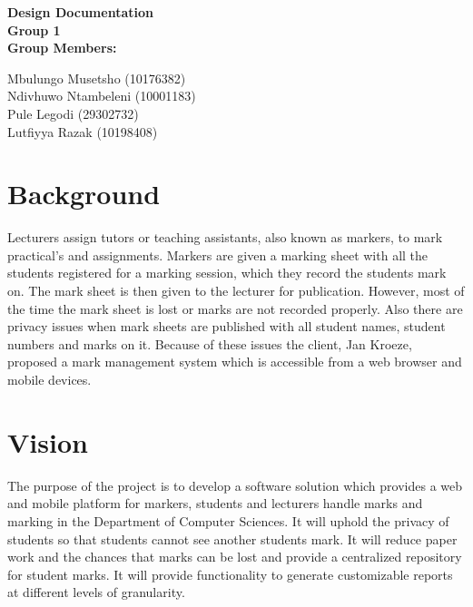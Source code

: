 \documentclass[12pt]{article}
\newcommand{\Title}{Design Documentation} %
\begin{document}
	\vspace{4em}
	
	\begin{center}%
	
	  \LARGE \bf \Title \\[4em]
	  \LARGE {\bf Group 1}\\[1em]
	  \LARGE {\bf Group Members:}\\[2em]
	  \large
	
	     Mbulungo Musetsho				(10176382) \\[1em]
	     Ndivhuwo Ntambeleni			(10001183) \\[1em]
	     Pule Legodi                    (29302732) \\[1em]
	     Lutfiyya Razak				(10198408) \\[1em]
	
	\end{center}%
	

	\newpage
	\tableofcontents
	
	\newpage
	\section{Background}
		Lecturers assign tutors or teaching assistants, also known as markers, 
		to mark practical’s and assignments. Markers are given a marking sheet 
		with all the students registered for a marking session, which they 
		record the students mark on. The mark sheet is then given to the lecturer
		for publication. However, most of the time the mark sheet is lost or marks
		are not recorded properly. Also there are privacy issues when mark sheets
		are published with all student names, student numbers and marks on it. 
		Because of these issues the client, Jan Kroeze, proposed a mark 
		management system which is accessible from a web browser and mobile devices.
	
		\vspace{0.2in}
	
		
		
	
	\section{Vision}
	The purpose of the project is to develop a software solution which provides
a web and mobile platform for markers, students and lecturers handle marks
and marking in the Department of Computer Sciences. It will uphold the
privacy of students so that students cannot see another students mark. It will
reduce paper work and the chances that marks can be lost and provide a
centralized repository for student marks. It will provide functionality to
generate customizable reports at different levels of granularity.
		\vspace{0.2in}
		
\end{document}
